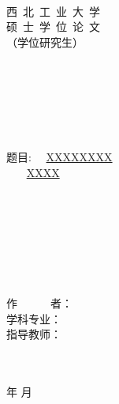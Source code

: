 \begin{titlepage}
	
    \sSanhao ~
    \begin{spacing}{1.5}
    	\begin{center}
    		\begin{center}
    			{
    				
    				\sSanhao 西~北~工~业~大~学 \\
    				\sYihao 硕~士~学~位~论~文 \\
    				\sSihao （学位研究生）\\
    			}
    		\end{center}
    		\fSong \sSihao ~ \\
    		\fSong \sSihao ~ \\
    		\fSong \sSihao ~ \\
    		\fSong \sSihao ~ \\
    		\fSong \sSihao ~ \\	
    		\begin{spacing}{1.5}
    			
    			\sErhao \fSong \hspace{1em} 题目: ~~\underline{XXXXXXXX}\\
    			
    			\sErhao \fSong \hspace{1em}  ~~~ \underline{XXXX}
    		\end{spacing}
    		\fSong \sWuhao ~ \\
    		\fSong \sWuhao ~ \\
    		\fSong \sWuhao ~ \\
    		\fSong \sWuhao ~ \\
    		\fSong \sWuhao ~ \\
    		\fSong \sWuhao ~ \\
    		{
    			\sSanhao\fSong 
    			作~~~~~~者：\\
    			\sSanhao\fSong 学科专业：\\
    			\sSanhao\fSong 指导教师：
    			
    		}
    		\fSong \sWuhao ~ \\
    		\fSong \sWuhao ~ \\
    		\fSong \sSanhao {}\fSong 年 \fSong 月
    	\end{center}
    \end{spacing}
    
\end{titlepage}
\fSong \normalsize

\endinput